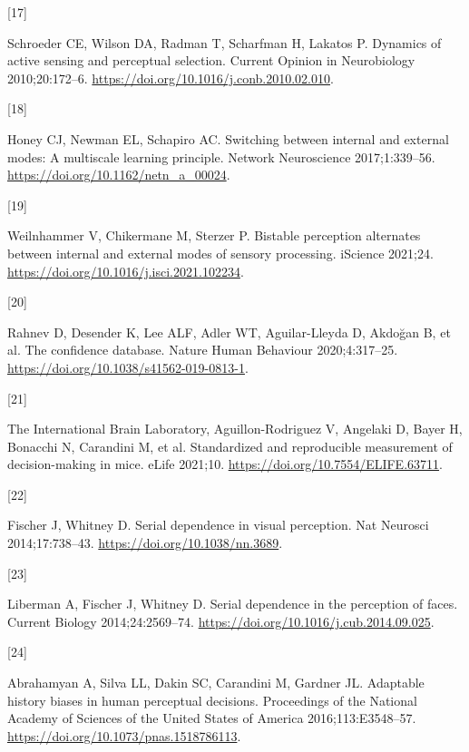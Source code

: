 \documentclass[
]{article}
\newlength{\cslhangindent}
\newlength{\csllabelwidth}
\newlength{\cslentryspacingunit} %
\newenvironment{CSLReferences}[2] %
 {%
  \setlength{\parindent}{0pt}
  \ifodd #1
  \let\oldpar\par
  \def\par{\hangindent=\cslhangindent\oldpar}
  \fi
  \setlength{\parskip}{#2\cslentryspacingunit}
 }%
 {}
\newcommand{\CSLLeftMargin}[1]{\parbox[t]{\csllabelwidth}{#1}}
\newcommand{\CSLRightInline}[1]{\parbox[t]{\linewidth - \csllabelwidth}{#1}\break}
\begin{document}
\begin{CSLReferences}{0}{0}
\leavevmode{}%
\CSLLeftMargin{{[}17{]} }%
\CSLRightInline{Schroeder CE, Wilson DA, Radman T, Scharfman H, Lakatos
P. Dynamics of active sensing and perceptual selection. Current Opinion
in Neurobiology 2010;20:172--6.
\url{https://doi.org/10.1016/j.conb.2010.02.010}.}

\leavevmode{}%
\CSLLeftMargin{{[}18{]} }%
\CSLRightInline{Honey CJ, Newman EL, Schapiro AC. Switching between
internal and external modes: A multiscale learning principle. Network
Neuroscience 2017;1:339--56.
\url{https://doi.org/10.1162/netn_a_00024}.}

\leavevmode{}%
\CSLLeftMargin{{[}19{]} }%
\CSLRightInline{Weilnhammer V, Chikermane M, Sterzer P. Bistable
perception alternates between internal and external modes of sensory
processing. iScience 2021;24.
\url{https://doi.org/10.1016/j.isci.2021.102234}.}

\leavevmode{}%
\CSLLeftMargin{{[}20{]} }%
\CSLRightInline{Rahnev D, Desender K, Lee ALF, Adler WT, Aguilar-Lleyda
D, Akdoğan B, et al. The confidence database. Nature Human Behaviour
2020;4:317--25. \url{https://doi.org/10.1038/s41562-019-0813-1}.}

\leavevmode{}%
\CSLLeftMargin{{[}21{]} }%
\CSLRightInline{The International Brain Laboratory, Aguillon-Rodriguez V, Angelaki D, Bayer H, Bonacchi N,
Carandini M, et al. Standardized and reproducible
measurement of decision-making in mice. eLife 2021;10.
\url{https://doi.org/10.7554/ELIFE.63711}.}

\leavevmode{}%
\CSLLeftMargin{{[}22{]} }%
\CSLRightInline{Fischer J, Whitney D. Serial dependence in visual
perception. Nat Neurosci 2014;17:738--43.
\url{https://doi.org/10.1038/nn.3689}.}

\leavevmode{}%
\CSLLeftMargin{{[}23{]} }%
\CSLRightInline{Liberman A, Fischer J, Whitney D. Serial dependence in
the perception of faces. Current Biology 2014;24:2569--74.
\url{https://doi.org/10.1016/j.cub.2014.09.025}.}

\leavevmode{}%
\CSLLeftMargin{{[}24{]} }%
\CSLRightInline{Abrahamyan A, Silva LL, Dakin SC, Carandini M, Gardner
JL. Adaptable history biases in human perceptual decisions. Proceedings
of the National Academy of Sciences of the United States of America
2016;113:E3548--57. \url{https://doi.org/10.1073/pnas.1518786113}.}


\end{CSLReferences}
\end{document}
